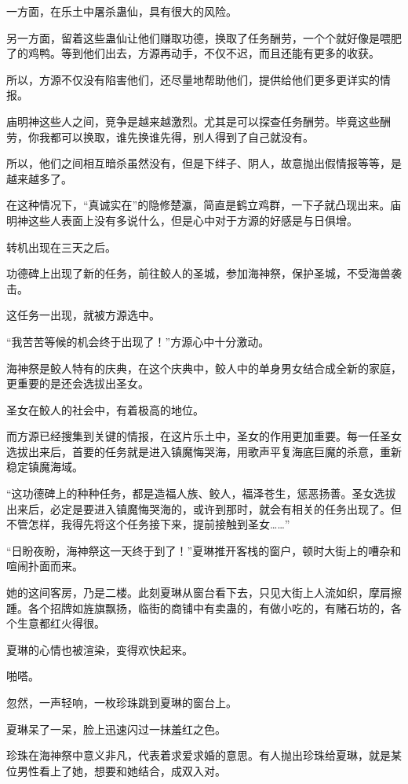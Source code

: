 \begin{this_body}
一方面，在乐土中屠杀蛊仙，具有很大的风险。

另一方面，留着这些蛊仙让他们赚取功德，换取了任务酬劳，一个个就好像是喂肥了的鸡鸭。等到他们出去，方源再动手，不仅不迟，而且还能有更多的收获。

所以，方源不仅没有陷害他们，还尽量地帮助他们，提供给他们更多更详实的情报。

庙明神这些人之间，竞争是越来越激烈。尤其是可以探查任务酬劳。毕竟这些酬劳，你我都可以换取，谁先换谁先得，别人得到了自己就没有。

所以，他们之间相互暗杀虽然没有，但是下绊子、阴人，故意抛出假情报等等，是越来越多了。

在这种情况下，“真诚实在”的隐修楚瀛，简直是鹤立鸡群，一下子就凸现出来。庙明神这些人表面上没有多说什么，但是心中对于方源的好感是与日俱增。

转机出现在三天之后。

功德碑上出现了新的任务，前往鲛人的圣城，参加海神祭，保护圣城，不受海兽袭击。

这任务一出现，就被方源选中。

“我苦苦等候的机会终于出现了！”方源心中十分激动。

海神祭是鲛人特有的庆典，在这个庆典中，鲛人中的单身男女结合成全新的家庭，更重要的是还会选拔出圣女。

圣女在鲛人的社会中，有着极高的地位。

而方源已经搜集到关键的情报，在这片乐土中，圣女的作用更加重要。每一任圣女选拔出来后，首要的任务就是进入镇魔悔哭海，用歌声平复海底巨魔的杀意，重新稳定镇魔海域。

“这功德碑上的种种任务，都是造福人族、鲛人，福泽苍生，惩恶扬善。圣女选拔出来后，必定是要进入镇魔悔哭海的，或许到那时，就会有相关的任务出现了。但不管怎样，我得先将这个任务接下来，提前接触到圣女……”

“日盼夜盼，海神祭这一天终于到了！”夏琳推开客栈的窗户，顿时大街上的嘈杂和喧闹扑面而来。

她的这间客房，乃是二楼。此刻夏琳从窗台看下去，只见大街上人流如织，摩肩擦踵。各个招牌如旌旗飘扬，临街的商铺中有卖蛊的，有做小吃的，有赌石坊的，各个生意都红火得很。

夏琳的心情也被渲染，变得欢快起来。

啪嗒。

忽然，一声轻响，一枚珍珠跳到夏琳的窗台上。

夏琳呆了一呆，脸上迅速闪过一抹羞红之色。

珍珠在海神祭中意义非凡，代表着求爱求婚的意思。有人抛出珍珠给夏琳，就是某位男性看上了她，想要和她结合，成双入对。


\end{this_body}
